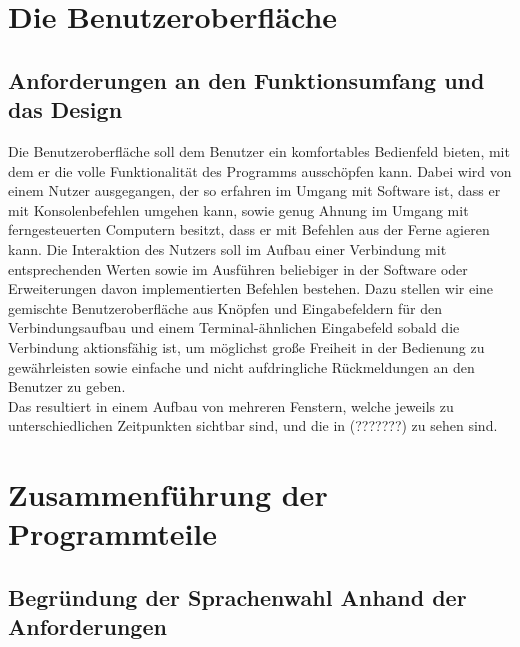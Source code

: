 \section{Die Benutzeroberfläche}
\subsection{Anforderungen an den Funktionsumfang und das Design}
Die Benutzeroberfläche soll dem Benutzer ein komfortables Bedienfeld bieten, mit dem er die volle Funktionalität des Programms ausschöpfen kann.
Dabei wird von einem Nutzer ausgegangen, der so erfahren im Umgang mit Software ist, dass er mit Konsolenbefehlen umgehen kann, sowie genug Ahnung im Umgang mit ferngesteuerten Computern besitzt, dass er mit Befehlen aus der Ferne agieren kann.
Die Interaktion des Nutzers soll im Aufbau einer Verbindung mit entsprechenden Werten sowie im Ausführen beliebiger in der Software oder Erweiterungen davon implementierten Befehlen bestehen.
Dazu stellen wir eine gemischte Benutzeroberfläche aus Knöpfen und Eingabefeldern für den Verbindungsaufbau und einem Terminal-ähnlichen Eingabefeld sobald die Verbindung aktionsfähig ist, um möglichst große Freiheit in der Bedienung zu gewährleisten sowie einfache und nicht aufdringliche Rückmeldungen an den Benutzer zu geben.\\
Das resultiert in einem Aufbau von mehreren Fenstern, welche jeweils zu unterschiedlichen Zeitpunkten sichtbar sind, und die in (???????) zu sehen sind.
\section{Zusammenführung der Programmteile}
\subsection{Begründung der Sprachenwahl Anhand der Anforderungen}
